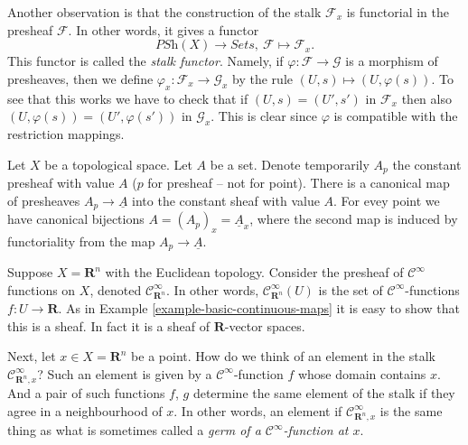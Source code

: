 \noindent
Another observation is that the construction of the stalk
$\mathcal{F}_x$ is functorial in the presheaf $\mathcal{F}$.
In other words, it gives a functor
$$
\textit{PSh}(X) \longrightarrow \textit{Sets},
\ \mathcal{F} \longmapsto \mathcal{F}_x.
$$
This functor is called the {\it stalk functor}.
Namely, if $\varphi : \mathcal{F} \to \mathcal{G}$ is
a morphism of presheaves, then we define
$\varphi_x : \mathcal{F}_x \to \mathcal{G}_x$
by the rule $(U, s) \mapsto (U, \varphi(s))$.
To see that this works we have to check that
if $(U, s) = (U', s')$ in $\mathcal{F}_x$ then also
$(U, \varphi(s)) = (U', \varphi(s'))$ in $\mathcal{G}_x$.
This is clear since $\varphi$ is compatible with the
restriction mappings.

\begin{example}
\label{example-stalk-constant-presheaf}
Let $X$ be a topological space. Let $A$ be a set.
Denote temporarily $A_p$ the constant presheaf
with value $A$ ($p$ for presheaf -- not for point).
There is a canonical map of presheaves
$A_p \to \underline{A}$ into the constant sheaf with
value $A$. For evey point we have canonical
bijections $A = (A_p)_x = \underline{A}_x$, where
the second map is induced by functoriality from
the map $A_p \to \underline{A}$.
\end{example}



\begin{example}
\label{example-germs-functions}
Suppose $X = \mathbf{R}^n$ with the Euclidean topology.
Consider the presheaf of $\mathcal{C}^\infty$ functions
on $X$, denoted $\mathcal{C}^\infty_{\mathbf{R}^n}$.
In other words, $\mathcal{C}^\infty_{\mathbf{R}^n}(U)$ is the set
of $\mathcal{C}^\infty$-functions $f : U \to \mathbf{R}$.
As in Example \ref{example-basic-continuous-maps}
it is easy to show that this is a sheaf. In fact it
is a sheaf of $\mathbf{R}$-vector spaces.

\medskip\noindent
Next, let $x \in X = \mathbf{R}^n$ be a point. How do
we think of an element in the stalk $\mathcal{C}^\infty_{\mathbf{R}^n, x}$?
Such an element is given by a $\mathcal{C}^\infty$-function
$f$ whose domain contains $x$. And a pair of such
functions $f$, $g$ determine
the same element of the stalk if they agree in a neighbourhood
of $x$. In other words, an element if $\mathcal{C}^\infty_{\mathbf{R}^n, x}$
is the same thing as what is sometimes called
a {\it germ of a $\mathcal{C}^\infty$-function at $x$}.
\end{example}

